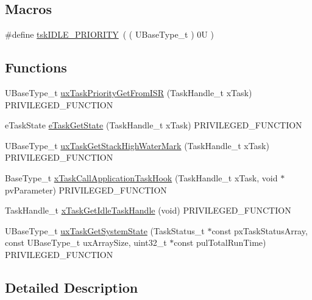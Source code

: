 \subsection*{Macros}
\begin{DoxyCompactItemize}
\item 
\#define \hyperlink{group___tasks_ga94ed0b9b3b4e8ccc859c322f18583e67}{tsk\+I\+D\+L\+E\+\_\+\+P\+R\+I\+O\+R\+I\+TY}~( ( U\+Base\+Type\+\_\+t ) 0\+U )
\end{DoxyCompactItemize}
\subsection*{Functions}
\begin{DoxyCompactItemize}
\item 
U\+Base\+Type\+\_\+t \hyperlink{group___tasks_gabc808e43d257a47de4b431483c65ea15}{ux\+Task\+Priority\+Get\+From\+I\+SR} (Task\+Handle\+\_\+t x\+Task) P\+R\+I\+V\+I\+L\+E\+G\+E\+D\+\_\+\+F\+U\+N\+C\+T\+I\+ON
\item 
e\+Task\+State \hyperlink{group___tasks_ga954df77397d616484edb7c58c7760b10}{e\+Task\+Get\+State} (Task\+Handle\+\_\+t x\+Task) P\+R\+I\+V\+I\+L\+E\+G\+E\+D\+\_\+\+F\+U\+N\+C\+T\+I\+ON
\item 
U\+Base\+Type\+\_\+t \hyperlink{group___tasks_ga799967af01d328132cde814e47733437}{ux\+Task\+Get\+Stack\+High\+Water\+Mark} (Task\+Handle\+\_\+t x\+Task) P\+R\+I\+V\+I\+L\+E\+G\+E\+D\+\_\+\+F\+U\+N\+C\+T\+I\+ON
\item 
Base\+Type\+\_\+t \hyperlink{group___tasks_gab6607e5d8a9664e3aa9fe16efa694e83}{x\+Task\+Call\+Application\+Task\+Hook} (Task\+Handle\+\_\+t x\+Task, void $\ast$pv\+Parameter) P\+R\+I\+V\+I\+L\+E\+G\+E\+D\+\_\+\+F\+U\+N\+C\+T\+I\+ON
\item 
Task\+Handle\+\_\+t \hyperlink{group___tasks_ga3d5446a4403457e855cb84b3bba5570a}{x\+Task\+Get\+Idle\+Task\+Handle} (void) P\+R\+I\+V\+I\+L\+E\+G\+E\+D\+\_\+\+F\+U\+N\+C\+T\+I\+ON
\item 
U\+Base\+Type\+\_\+t \hyperlink{group___tasks_gaa4603f3de3d809e9beb18d10fbac005d}{ux\+Task\+Get\+System\+State} (Task\+Status\+\_\+t $\ast$const px\+Task\+Status\+Array, const U\+Base\+Type\+\_\+t ux\+Array\+Size, uint32\+\_\+t $\ast$const pul\+Total\+Run\+Time) P\+R\+I\+V\+I\+L\+E\+G\+E\+D\+\_\+\+F\+U\+N\+C\+T\+I\+ON
\end{DoxyCompactItemize}


\subsection{Detailed Description}


